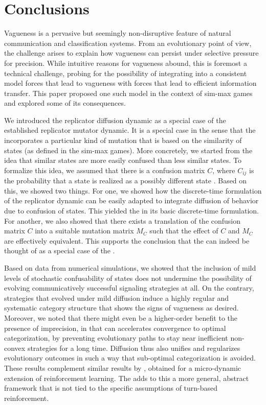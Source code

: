 \section{Conclusions}
\label{sec:conclusions}

Vagueness is a pervasive but seemingly non-disruptive feature of
natural communication and classification systems. From an evolutionary
point of view, the challenge arises to explain how vagueness can
persist under selective pressure for precision. While intuitive
reasons for vagueness abound, this is foremost a technical challenge,
probing for the possibility of integrating into a consistent model
forces that lead to vagueness with forces that lead to efficient
information transfer. This paper proposed one such model in the
context of sim-max games and explored some of its consequences.

We introduced the replicator diffusion dynamic as a special case of
the established replicator mutator dynamic. It is a special case in
the sense that the \rdd incorporates a particular kind of mutation
that is based on the similarity of states (as defined in the sim-max
games). More concretely, we started from the idea that similar states
are more easily confused than less similar states. To formalize this
idea, we assumed that there is a confusion matrix $C$, where $C_{ij}$
is the probability that a state  is realized as a possibly
different state . Based on this, we showed two things. For
one, we showed how the discrete-time formulation of the replicator
dynamic can be easily adapted to integrate diffusion of behavior due
to confusion of states. This yielded the \rdd in its basic
discrete-time formulation. For another, we also showed that there
exists a translation of the confusion matrix $C$ into a suitable
mutation matrix $M_C$ such that the effect of $C$ and $M_C$ are
effectively equivalent. This supports the conclusion that the \rdd can
indeed be thought of as a special case of the \rmd.

Based on data from numerical simulations, we showed that the inclusion
of mild levels of stochastic confusability of states does not
undermine the possibility of evolving communicatively successful
signaling strategies at all. On the contrary, strategies that evolved
under mild diffusion induce a highly regular and systematic category
structure that shows the signs of vagueness as desired. Moreover, we
noted that there might even be a higher-order benefit to the presence
of imprecision, in that can accelerates convergence to optimal
categorization, by preventing evolutionary paths to stay near
inefficient non-convex strategies for a long time. Diffusion thus also
unifies and regularizes evolutionary outcomes in such a way that
sub-optimal categorization is avoided. These results complement
similar results by \citet{OConnor2013:The-Evolution-o}, obtained for a
micro-dynamic extension of reinforcement learning. The \rdd adds to
this a more general, abstract framework that is not tied to the
specific assumptions of turn-based reinforcement.

